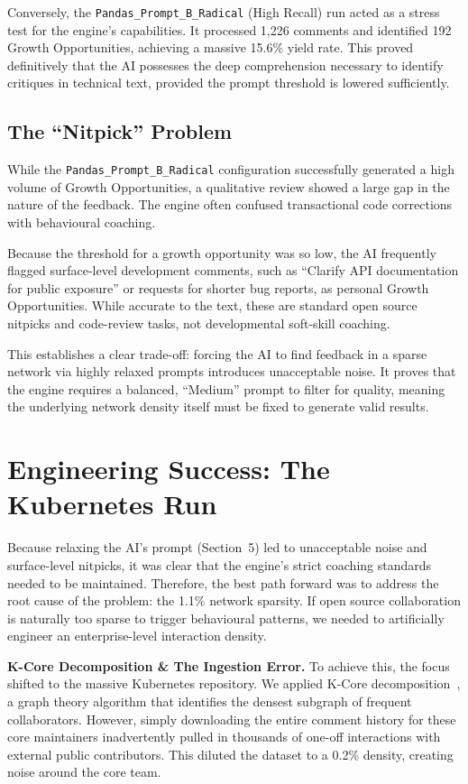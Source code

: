 \documentclass[conference]{IEEEconf}
\begin{document}
Conversely, the \texttt{Pandas\_Prompt\_B\_Radical} (High Recall) run acted as a stress test for the engine's capabilities. It processed 1,226 comments and identified 192 Growth Opportunities, achieving a massive 15.6\% yield rate. This proved definitively that the AI possesses the deep comprehension necessary to identify critiques in technical text, provided the prompt threshold is lowered sufficiently.

\subsection{The ``Nitpick'' Problem}
While the \texttt{Pandas\_Prompt\_B\_Radical} configuration successfully generated a high volume of Growth Opportunities, a qualitative review showed a large gap in the nature of the feedback. The engine often confused transactional code corrections with behavioural coaching.

Because the threshold for a growth opportunity was so low, the AI frequently flagged surface-level development comments, such as ``Clarify API documentation for public exposure'' or requests for shorter bug reports, as personal Growth Opportunities. While accurate to the text, these are standard open source nitpicks and code-review tasks, not developmental soft-skill coaching.

This establishes a clear trade-off: forcing the AI to find feedback in a sparse network via highly relaxed prompts introduces unacceptable noise. It proves that the engine requires a balanced, ``Medium'' prompt to filter for quality, meaning the underlying network density itself must be fixed to generate valid results.

\section{Engineering Success: The Kubernetes Run}
Because relaxing the AI's prompt (Section~5) led to unacceptable noise and surface-level nitpicks, it was clear that the engine's strict coaching standards needed to be maintained. Therefore, the best path forward was to address the root cause of the problem: the 1.1\% network sparsity. If open source collaboration is naturally too sparse to trigger behavioural patterns, we needed to artificially engineer an enterprise-level interaction density.

\textbf{K-Core Decomposition \& The Ingestion Error.}
To achieve this, the focus shifted to the massive Kubernetes repository. We applied K-Core decomposition~\cite{seidman1983network,batagelj2011fast}, a graph theory algorithm that identifies the densest subgraph of frequent collaborators. However, simply downloading the entire comment history for these core maintainers inadvertently pulled in thousands of one-off interactions with external public contributors. This diluted the dataset to a 0.2\% density, creating noise around the core team.
\end{document}

